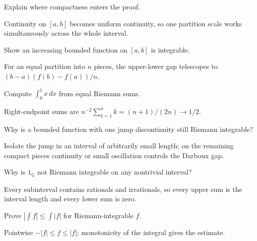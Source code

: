 \begin{problem}\label{prob:ii10-problem-03}
Explain where compactness enters the proof.
\end{problem}
\begin{solution}
Continuity on $[a,b]$ becomes uniform continuity, so one partition scale works simultaneously across the whole interval.
\end{solution}

\begin{problem}\label{prob:ii10-problem-04}
Show an increasing bounded function on $[a,b]$ is integrable.
\end{problem}
\begin{solution}
For an equal partition into $n$ pieces, the upper-lower gap telescopes to $(b-a)(f(b)-f(a))/n$.
\end{solution}

\begin{problem}[Integral of $x$]\label{prob:ii10-problem-05}
Compute $\int_0^1x\,dx$ from equal Riemann sums.
\end{problem}
\begin{solution}
Right-endpoint sums are $n^{-2}\sum_{k=1}^nk=(n+1)/(2n)\to1/2$.
\end{solution}

\begin{problem}\label{prob:ii10-problem-06}
Why is a bounded function with one jump discontinuity still Riemann integrable?
\end{problem}
\begin{solution}
Isolate the jump in an interval of arbitrarily small length; on the remaining compact pieces continuity or small oscillation controls the Darboux gap.
\end{solution}

\begin{problem}\label{prob:ii10-problem-07}
Why is $1_{\mathbb Q}$ not Riemann integrable on any nontrivial interval?
\end{problem}
\begin{solution}
Every subinterval contains rationals and irrationals, so every upper sum is the interval length and every lower sum is zero.
\end{solution}

\begin{problem}\label{prob:ii10-problem-08}
Prove $|\int f|\le\int|f|$ for Riemann-integrable $f$.
\end{problem}
\begin{solution}
Pointwise $-|f|\le f\le|f|$; monotonicity of the integral gives the estimate.
\end{solution}

